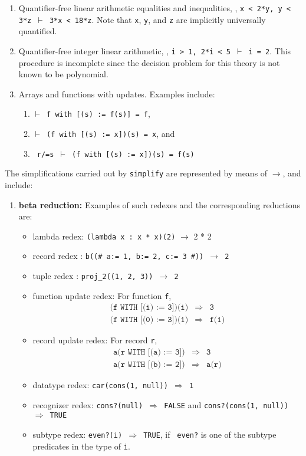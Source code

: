 \documentclass[12pt,twoside]{book}
\makeatletter
\newcommand{\indtt}[1]{\texttt{#1}\index{#1@{\texttt{#1}}}}  %
\makeatother
\begin{document}
\begin{description}
\begin{enumerate}
\item Quantifier-free linear arithmetic equalities and inequalities, \eg,
\texttt{x < 2*y, y < 3*z $\vdash$  3*x < 18*z}.  Note that \texttt{x}, \texttt{y},
and \texttt{z} are implicitly universally quantified. 


\item Quantifier-free integer linear arithmetic, \eg,
\texttt{i > 1, 2*i < 5 $\vdash$ i = 2}.   This procedure is
incomplete since the decision problem for this theory is not known to be
polynomial.

\item Arrays and functions with updates.  Examples include:
\begin{enumerate}
\item  \texttt{$\vdash$ f with [(s) := f(s)] = f},
\item  \texttt{$\vdash$ (f with [(s) := x])(s) = x}, and
\item  \texttt{ r/=s $\vdash$ (f with [(s) := x])(s) = f(s)}
\end{enumerate}
\end{enumerate}

The simplifications carried out by \indtt{simplify} are represented
by means of $\longrightarrow$, and  include:
\begin{enumerate}
\item {\bf beta reduction:}  Examples of such redexes and the
corresponding reductions are:
\begin{itemize}
\item lambda redex: \texttt{(lambda x : x * x)(2)} $\longrightarrow$ 2 * 2
\item record redex : \texttt{b((\# a:= 1, b:= 2, c:= 3 \#)) $\longrightarrow$
2}
\item tuple redex :   \texttt{proj\_2((1, 2, 3))  $\longrightarrow$ 2}
\item function update redex: For function \texttt{f},
\begin{eqnarray*}
 \texttt{(f\ WITH\ [(i) := 3])(i)} &\Longrightarrow & \texttt{3}\\
   \texttt{(f\ WITH\ [(0) := 3])(1)} &\Longrightarrow & \texttt{f(1)}
\end{eqnarray*}
\item record update redex: For record \texttt{r},
\begin{eqnarray*}
\texttt{a(r\ WITH\ [(a) := 3])}  & \Longrightarrow& \texttt{3}\\
\texttt{a(r\ WITH\ [(b) := 2])} & \Longrightarrow & \texttt{a(r)}
\end{eqnarray*}
\item datatype redex: \texttt{car(cons(1, null)) $\Longrightarrow$ 1}
\item recognizer redex:  \texttt{cons?(null) $\Longrightarrow$ FALSE} and
                     \texttt{cons?(cons(1, null)) $\Longrightarrow$ TRUE}
\item subtype redex:  \texttt{even?(i) $\Longrightarrow$ TRUE}, if {\tt
even?}
is one of the subtype predicates in the type of \texttt{i}.
\end{itemize}


\end{enumerate}
\end{description}
\end{document}
